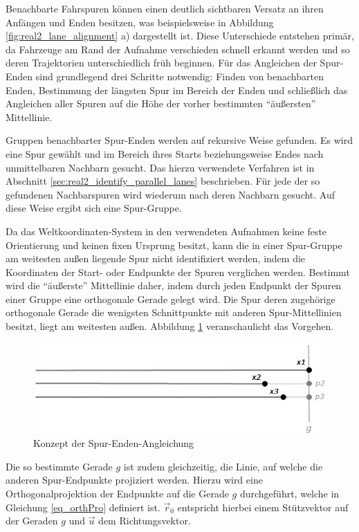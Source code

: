 Benachbarte Fahrspuren können einen deutlich sichtbaren Versatz an ihren Anfängen
und Enden besitzen, was beispielsweise in Abbildung \ref{fig:real2_lane_alignment} a) dargestellt ist. Diese Unterschiede entstehen
primär, da Fahrzeuge am Rand der Aufnahme verschieden schnell erkannt werden und so deren Trajektorien
unterschiedlich früh beginnen. Für das Angleichen der Spur-Enden sind grundlegend drei Schritte notwendig:
Finden von benachbarten Enden, Bestimmung der längsten Spur im Bereich der Enden und schließlich das
Angleichen aller Spuren auf die Höhe der vorher bestimmten ``äußersten'' Mittellinie.

Gruppen benachbarter Spur-Enden werden auf rekursive Weise gefunden. Es wird eine Spur gewählt und im
Bereich ihres Starts beziehungsweise Endes nach unmittelbaren Nachbarn gesucht. Das hierzu verwendete
Verfahren ist in Abschnitt \ref{sec:real2_identify_parallel_lanes} beschrieben. Für jede der so gefundenen
Nachbarspuren wird wiederum nach deren Nachbarn gesucht. Auf diese Weise ergibt sich eine Spur-Gruppe.

Da das Weltkoordinaten-System in den verwendeten Aufnahmen keine feste Orientierung und keinen fixen Ursprung besitzt,
kann die in einer Spur-Gruppe am weitesten außen liegende Spur nicht identifiziert werden, indem die
Koordinaten der Start- oder Endpunkte der Spuren verglichen werden.
Bestimmt wird die ``äußerste'' Mittellinie daher, indem durch jeden Endpunkt der Spuren einer Gruppe
eine orthogonale Gerade gelegt wird. Die Spur deren zugehörige orthogonale Gerade die wenigsten Schnittpunkte
mit anderen Spur-Mittellinien besitzt, liegt am weitesten außen. Abbildung \ref{fig:real2_lane_alignment_concept}
veranschaulicht das Vorgehen.

\begin{figure}[H]
    \centering
    \includegraphics[width=0.5\linewidth]{resources/img/umsetzung/U2/LaneAlignment_concept}
    \caption{Konzept der Spur-Enden-Angleichung}
    \label{fig:real2_lane_alignment_concept}
\end{figure}

Die so bestimmte Gerade $g$ ist zudem gleichzeitig, die Linie, auf welche die anderen Spur-Endpunkte
projiziert werden. Hierzu wird eine Orthogonalprojektion der Endpunkte auf die Gerade $g$ durchgeführt, welche
in Gleichung \ref{eq_orthPro} definiert ist. $\vec r_0$ entspricht hierbei einem Stützvektor auf der Geraden $g$ und
$\vec u$ dem Richtungsvektor.

